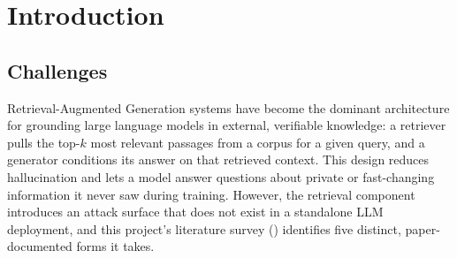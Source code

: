 \section{Introduction}
\label{sec:intro}

\subsection{Challenges}
\label{sec:challenges}

Retrieval-Augmented Generation systems have become the dominant
architecture for grounding large language models in external, verifiable
knowledge: a retriever pulls the top-$k$ most relevant passages from a
corpus for a given query, and a generator conditions its answer on that
retrieved context. This design reduces hallucination and lets a model
answer questions about private or fast-changing information it never saw
during training. However, the retrieval component introduces an attack
surface that does not exist in a standalone LLM deployment, and this
project's literature survey () identifies five
distinct, paper-documented forms it takes.

